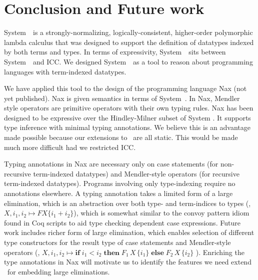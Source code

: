 \section{Conclusion and Future work}
\label{sec:concl}

System~\Fi\ is a strongly-normalizing, logically-consistent, higher-order
polymorphic lambda calculus that was designed to support the
definition of datatypes indexed by both terms and types.
In terms of expressivity, System~\Fi\ sits between System~\Fw\ and ICC.
We designed System~\Fi\ as a tool to reason about programming
languages with term-indexed datatypes. 

We have applied this tool to the design of the programming language Nax (not yet published).
Nax is given semantics in terms of System~\Fi . In Nax, Mendler style operators
are primitive operators with their own typing rules. Nax has been designed to
be expressive over the Hindley-Milner subset of System \Fi. It supports type
inference with minimal typing annotations. We believe this is an advantage
made possible because our extensions to \Fw\ are all static. This would be made
much more difficult had we restricted ICC.

Typing annotations in Nax are necessary only
on case statements (for non-recursive term-indexed datatypes)
and Mendler-style operators (for recursive term-indexed datatypes).
Programs involving only type-indexing require no annotations elsewhere.
A typing annotation takes a limited form of a large elimination,
which is an abstraction over both type- and term-indices to types
(\eg, $X,i_1,i_2 \mapsto F X \{i_1 + i_2\}$), which is somewhat similar to
the convoy pattern idiom \cite{cpdt} found in Coq scripts to aid
type checking dependent case expressions.
Future work includes richer form of large elimination, which enables selection
of different type constructors for the result type of case statements
and Mendler-style operators (\eg, 
 $X,i_1,i_2 \mapsto \textbf{if}\;i_1<i_2\;
	\textbf{then}\; F_1\,X\,\{i_1\}\;\textbf{else}\;F_2\, X\,\{i_2\}$ ).
Enriching the type annotations in Nax will motivate us to identify
the features we need extend \Fi\ for embedding large eliminations.

 
